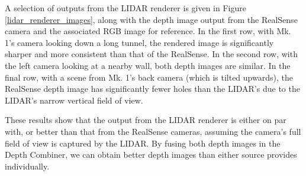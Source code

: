 A selection of outputs from the LIDAR renderer is given in Figure \ref{lidar_renderer_images}, along with the depth image output from the RealSense camera and the associated RGB image for reference. In the first row, with Mk. 1's camera looking down a long tunnel, the rendered image is significantly sharper and more consistent than that of the RealSense. In the second row, with the left camera looking at a nearby wall, both depth images are similar. In the final row, with a scene from Mk. 1's back camera (which is tilted upwards), the RealSense depth image has significantly fewer holes than the LIDAR's due to the LIDAR's narrow vertical field of view. 

These results show that the output from the LIDAR renderer is either on par with, or better than that from the RealSense cameras, assuming the camera's full field of view is captured by the LIDAR. By fusing both depth images in the Depth Combiner, we can obtain better depth images than either source provides individually.

